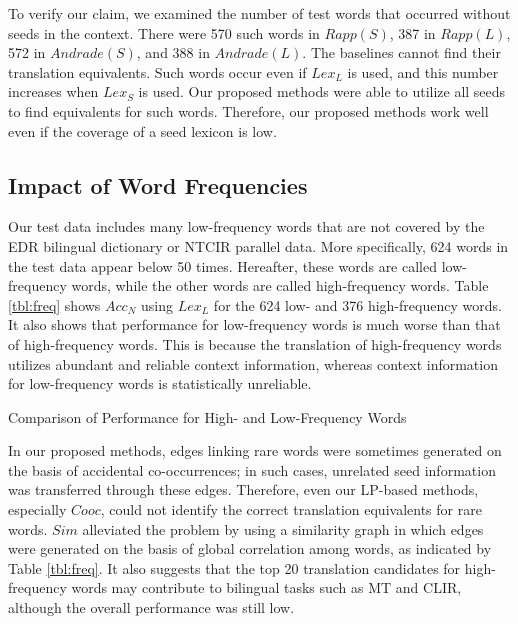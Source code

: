 \documentclass[english]{jnlp_1.4}
\begin{document}
To verify our claim, we examined the number of test words that occurred without seeds in the context. 
There were 570 such words in $\mathit{Rapp}(S)$, 387 in $\mathit{Rapp}(L)$, 572 in $\mathit{Andrade}(S)$, and 388 in $\mathit{Andrade}(L)$. 
The baselines cannot find their translation equivalents. 
Such words occur even if $\mathit{Lex}_{L}$ is used, and this number increases when $\mathit{Lex}_{S}$ is used. 
Our proposed methods were able to utilize all seeds to find equivalents for such words. 
Therefore, our proposed methods work well even if the coverage of a seed lexicon is low. 


\subsection{Impact of Word Frequencies}
\label{sect:freq}

Our test data includes many low-frequency words that are not covered by the EDR bilingual dictionary or NTCIR parallel data. 
More specifically, 624 words in the test data appear below 50 times. 
Hereafter, these words are called low-frequency words, while the other words are called high-frequency words. 
Table \ref{tbl:freq} shows $\mathit{Acc}_{N}$ using $\mathit{Lex}_{L}$ for the 624 low- and 376 high-frequency words. 
It also shows that performance for low-frequency words is much worse than that of high-frequency words. 
This is because the translation of high-frequency words utilizes abundant and reliable context information, whereas context information for low-frequency words is statistically unreliable. 

\begin{table}[b]
\caption{Comparison of Performance for High- and Low-Frequency Words}
\label{tbl:freq}

\end{table}

In our proposed methods, edges linking rare words were sometimes generated on the basis of accidental co-occurrences; in such cases, unrelated seed information was transferred through these edges. 
Therefore, even our LP-based methods, especially $\mathit{Cooc}$, could not identify the correct translation equivalents for rare words. 
$\mathit{Sim}$ alleviated the problem by using a similarity graph in which edges were generated on the basis of global correlation among words, as indicated by Table \ref{tbl:freq}. 
It also suggests that the top 20 translation candidates for high-frequency words may contribute to bilingual tasks such as MT and CLIR, although the overall performance was still low. 
\end{document}
